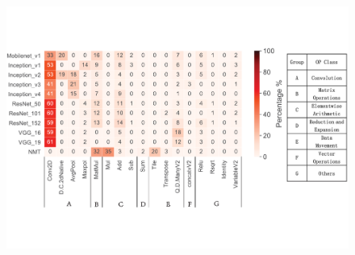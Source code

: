 





\begin{figure}
\centering
\begin{minipage}[c]{0.6\textwidth}
\centering
\includegraphics[width=1\textwidth]{figure/break11models.pdf}
\end{minipage}%
\begin{minipage}[c]{0.16\textwidth}
\centering

\end{minipage}
\end{figure}
